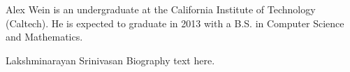 \documentclass[journal]{IEEEtran}
\begin{document}


% 

\begin{IEEEbiography}{Alex Wein}
is an undergraduate at the California Institute of Technology (Caltech). He is expected to graduate in 2013 with a B.S. in Computer Science and Mathematics.
\end{IEEEbiography}

\begin{IEEEbiography}{Lakshminarayan Srinivasan}
Biography text here.
\end{IEEEbiography}









\end{document}
